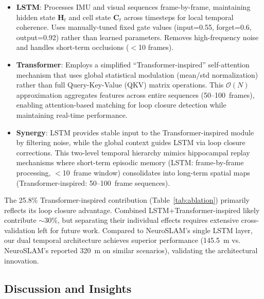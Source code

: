 \begin{itemize}
    \item \textbf{LSTM}: Processes IMU and visual sequences frame-by-frame, maintaining hidden state $\mathbf{H}_t$ and cell state $\mathbf{C}_t$ across timesteps for local temporal coherence. Uses manually-tuned fixed gate values (input=0.55, forget=0.6, output=0.92) rather than learned parameters. Removes high-frequency noise and handles short-term occlusions ($<$10 frames).
    
    \item \textbf{Transformer}: Employs a simplified ``Trans\-form\-er-in\-spired'' self-attention mechanism that uses global statistical modulation (mean/std normali\-zation) rather than full Query-Key-Value (QKV) matrix operations. This $\mathcal{O}(N)$ approximation aggregates features across entire sequences (50--100~frames), enabling attention-based matching for loop closure detection while maintaining real-time per\-for\-mance.
    
    \item \textbf{Synergy}: LSTM provides stable input to the Trans\-form\-er-in\-spired module by filtering noise, while the global context guides LSTM via loop closure corrections. This two-level temporal hierarchy mimics hippocampal replay mechanisms where short-term episodic memory (LSTM: frame-by-frame processing, $<$10~frame window) consolidates into long-term spatial maps (Trans\-form\-er-in\-spired: 50--100~frame sequences).
\end{itemize}

The 25.8\% Trans\-form\-er-in\-spired con\-tri\-bu\-tion (Table~\ref{tab:ablation}) primarily reflects its loop closure advantage. Combined LSTM+Trans\-form\-er-in\-spired likely contribute $\sim$30\%, but separating their individual effects requires extensive cross-validation left for future work. Compared to NeuroSLAM's single LSTM layer, our dual temporal architecture achieves superior per\-for\-mance (145.5~m vs. NeuroSLAM's reported 320~m on similar scenarios), validating the architectural innovation.

\subsection{Discussion and Insights}

